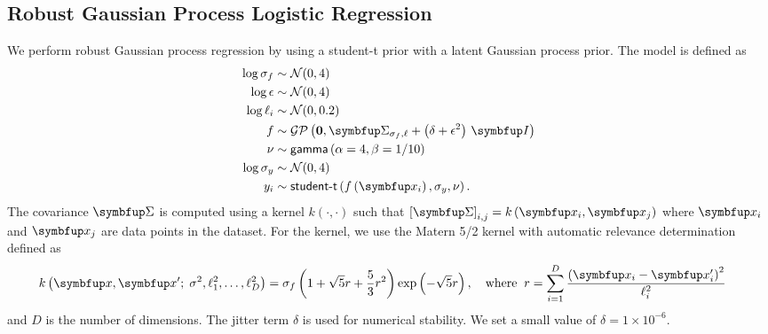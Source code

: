 \subsection{Robust Gaussian Process Logistic Regression}\label{section:model_rgp}
We perform robust Gaussian process regression by using a student-t prior with a latent Gaussian process prior.
The model is defined as
\begin{align*}
   \log \sigma_f &\sim \mathcal{N}(0, 4) \\
   \log \epsilon &\sim \mathcal{N}(0, 4) \\
   \log \ell_i   &\sim \mathcal{N}(0, 0.2) \\
   f   &\sim \mathcal{GP}\left(\mathbf{0}, \mSigma_{\sigma_f, \mathbf{\ell}} + \left(\delta + \epsilon^2\right)\,\mI \right) \\
   \nu &\sim \mathsf{gamma}\left(\alpha=4, \beta=1/10\right) \\
   \log \sigma_y &\sim \mathcal{N}(0, 4) \\
   y_i &\sim \mathsf{student\text{-}t}\left(  f\left( \vx_i \right), \sigma_y, \nu  \right).
\end{align*}
The covariance \(\mSigma\) is computed using a kernel \(k\left(\cdot, \cdot\right)\) such that \({[\mSigma]}_{i,j} = k\left( \vx_{i}, \vx_{j} \right) \) where \(\vx_i\) and \(\vx_j\) are data points in the dataset.
For the kernel, we use the Matern 5/2 kernel with automatic relevance determination~\citep{neal_bayesian_1996} defined as
\begin{align*}
  &k\left(\vx, \vx' ;\; \sigma^2, \ell^2_1, \ldots, \ell^2_D \right) =
  \sigma_f \left( 1 + \sqrt{5} r + \frac{5}{3} r^2 \right) \exp\left( - \sqrt{5} r \right), \quad
  \text{where}\;\; r = \sum^{D}_{i=1} \frac{ {\left(\vx_i - \vx'_i\right)}^2 }{\ell^2_i}
\end{align*}
and \(D\) is the number of dimensions.
The jitter term \(\delta\) is used for numerical stability.
We set a small value of \(\delta = 1\times10^{-6}\).

